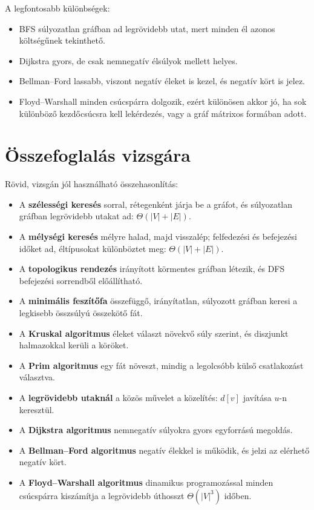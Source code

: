 \begin{center}

\end{center}

A legfontosabb különbségek:

\begin{itemize}
  \item BFS súlyozatlan gráfban ad legrövidebb utat, mert minden él azonos költségűnek tekinthető.
  \item Dijkstra gyors, de csak nemnegatív élsúlyok mellett helyes.
  \item Bellman--Ford lassabb, viszont negatív éleket is kezel, és negatív kört is jelez.
  \item Floyd--Warshall minden csúcspárra dolgozik, ezért különösen akkor jó, ha sok különböző kezdőcsúcsra kell lekérdezés, vagy a gráf mátrixos formában adott.
\end{itemize}

\section{Összefoglalás vizsgára}

Rövid, vizsgán jól használható összehasonlítás:

\begin{itemize}
  \item A \textbf{szélességi keresés} sorral, rétegenként járja be a gráfot, és súlyozatlan gráfban legrövidebb utakat ad: $\Theta(|V|+|E|)$.
  \item A \textbf{mélységi keresés} mélyre halad, majd visszalép; felfedezési és befejezési időket ad, éltípusokat különböztet meg: $\Theta(|V|+|E|)$.
  \item A \textbf{topologikus rendezés} irányított körmentes gráfban létezik, és DFS befejezési sorrendből előállítható.
  \item A \textbf{minimális feszítőfa} összefüggő, irányítatlan, súlyozott gráfban keresi a legkisebb összsúlyú összekötő fát.
  \item A \textbf{Kruskal algoritmus} éleket választ növekvő súly szerint, és diszjunkt halmazokkal kerüli a köröket.
  \item A \textbf{Prim algoritmus} egy fát növeszt, mindig a legolcsóbb külső csatlakozást választva.
  \item A \textbf{legrövidebb utaknál} a közös művelet a közelítés: $d[v]$ javítása $u$-n keresztül.
  \item A \textbf{Dijkstra algoritmus} nemnegatív súlyokra gyors egyforrású megoldás.
  \item A \textbf{Bellman--Ford algoritmus} negatív élekkel is működik, és jelzi az elérhető negatív kört.
  \item A \textbf{Floyd--Warshall algoritmus} dinamikus programozással minden csúcspárra kiszámítja a legrövidebb úthosszt $\Theta(|V|^3)$ időben.
\end{itemize}
